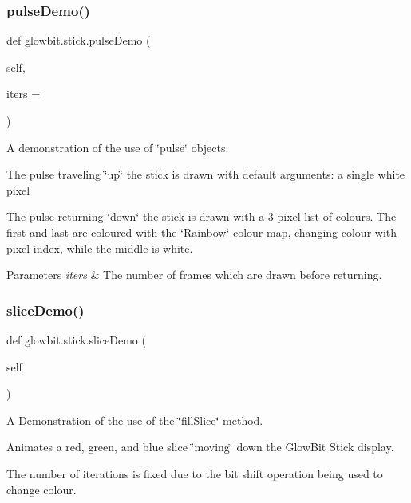 \subsubsection{\texorpdfstring{pulse\+Demo()}{pulseDemo()}}
{\footnotesize\ttfamily def glowbit.\+stick.\+pulse\+Demo (\begin{DoxyParamCaption}\item[{}]{self,  }\item[{}]{iters = {} }\end{DoxyParamCaption})}



A demonstration of the use of \char`\"{}pulse\char`\"{} objects. 

The pulse traveling \char`\"{}up\char`\"{} the stick is drawn with default arguments\+: a single white pixel

The pulse returning \char`\"{}down\char`\"{} the stick is drawn with a 3-\/pixel list of colours. The first and last are coloured with the \char`\"{}\+Rainbow\char`\"{} colour map, changing colour with pixel index, while the middle is white.


\begin{DoxyParams}{Parameters}
{\em iters} & The number of frames which are drawn before returning. \\
\hline
\end{DoxyParams}
\mbox{\label{classglowbit_1_1stick_a26eedb25d40d67d1e2ca786a7b8eb8b0}} 
\subsubsection{\texorpdfstring{slice\+Demo()}{sliceDemo()}}
{\footnotesize\ttfamily def glowbit.\+stick.\+slice\+Demo (\begin{DoxyParamCaption}\item[{}]{self }\end{DoxyParamCaption})}



A Demonstration of the use of the \char`\"{}fill\+Slice\char`\"{} method. 

Animates a red, green, and blue slice \char`\"{}moving\char`\"{} down the Glow\+Bit Stick display.

The number of iterations is fixed due to the bit shift operation being used to change colour. \mbox{\label{classglowbit_1_1stick_acde1622da63c602b209a608384cb6020}} 
